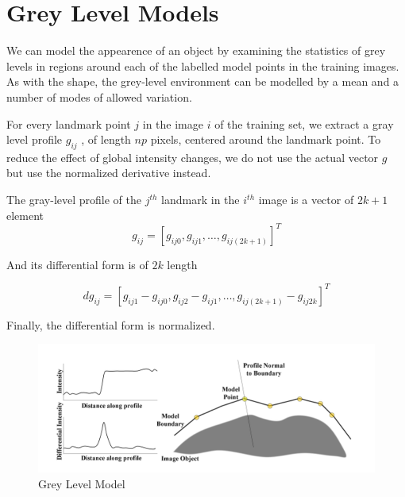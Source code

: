 \section{Grey Level Models}
We can model the appearence of an object by examining
the statistics of grey levels in regions around each
of the labelled model points in the training images.
As with the shape, the grey-level environment can be
modelled by a mean and a number of modes of allowed variation.

For every landmark point $j$ in the image $i$ of the
training set, we extract a gray level profile $g_{ij}$ , of length
$np$ pixels, centered around the landmark point.
To reduce the effect of global intensity changes, we do not use
the actual vector $g$ but use the normalized derivative instead.

The gray-level profile of the $j^{th}$ landmark in the $i^{th}$
image is a vector of $2k+1$ element
$${g_{ij} =  [g_{ij0}, g_{ij1}, \ldots, g_{ij(2k+1)}]}^T$$

And its differential form is of $2k$ length

$$ {dg_{ij} =  [g_{ij1} - g_{ij0}, g_{ij2} - g_{ij1}, \ldots, g_{ij(2k+1)}  - g_{ij 2k}]}^T$$

Finally, the differential form is normalized.

\begin{figure}[h]
  \centering
  \includegraphics[width=\linewidth]{img/grey-level}
  \caption{Grey Level Model}
\end{figure}